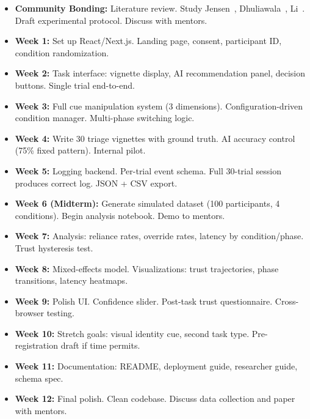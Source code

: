 \documentclass[12pt]{article}
\begin{document}
\begin{itemize}
\item \textbf{Community Bonding:} Literature review. Study Jensen~\cite{jensen2020}, Dhuliawala~\cite{dhuliawala2023}, Li~\cite{li2024}. Draft experimental protocol. Discuss with mentors.

\item \textbf{Week 1:} Set up React/Next.js. Landing page, consent, participant ID, condition randomization.

\item \textbf{Week 2:} Task interface: vignette display, AI recommendation panel, decision buttons. Single trial end-to-end.

\item \textbf{Week 3:} Full cue manipulation system (3 dimensions). Configuration-driven condition manager. Multi-phase switching logic.

\item \textbf{Week 4:} Write 30 triage vignettes with ground truth. AI accuracy control (75\% fixed pattern). Internal pilot.

\item \textbf{Week 5:} Logging backend. Per-trial event schema. Full 30-trial session produces correct log. JSON + CSV export.

\item \textbf{Week 6 (Midterm):} Generate simulated dataset (100 participants, 4 conditions). Begin analysis notebook. Demo to mentors.

\item \textbf{Week 7:} Analysis: reliance rates, override rates, latency by condition/phase. Trust hysteresis test.

\item \textbf{Week 8:} Mixed-effects model. Visualizations: trust trajectories, phase transitions, latency heatmaps.

\item \textbf{Week 9:} Polish UI. Confidence slider. Post-task trust questionnaire. Cross-browser testing.

\item \textbf{Week 10:} Stretch goals: visual identity cue, second task type. Pre-registration draft if time permits.

\item \textbf{Week 11:} Documentation: README, deployment guide, researcher guide, schema spec.

\item \textbf{Week 12:} Final polish. Clean codebase. Discuss data collection and paper with mentors.
\end{itemize}
\end{document}
